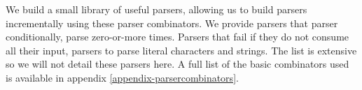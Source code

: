 We build a small library of useful parsers, allowing us to build parsers
incrementally using these parser combinators. We provide parsers that parser
conditionally, parse zero-or-more times. Parsers that fail if they do not
consume all their input, parsers to parse literal characters and strings. The
list is extensive so we will not detail these parsers here. A full list of
the basic combinators used is available in appendix \ref{appendix-parsercombinators}.
